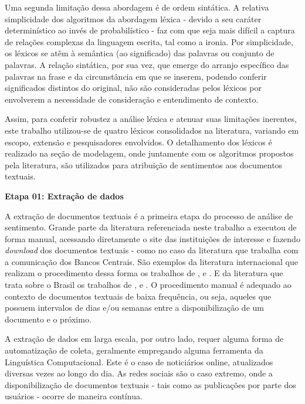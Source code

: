Uma segunda limitação dessa abordagem é de ordem sintática. A relativa simplicidade dos algoritmos da abordagem léxica - devido a seu caráter determinístico ao invés de probabilístico - faz com que seja mais difícil a captura de relações complexas da linguagem escrita, tal como a ironia. Por simplicidade, os léxicos se atêm à semântica (ao significado) das palavras ou conjunto de palavras. A relação sintática, por sua vez, que emerge do arranjo específico das palavras na frase e da circunstância em que se inserem, podendo conferir significados distintos do original, não são consideradas pelos léxicos por envolverem a necessidade de consideração e entendimento de contexto.

Assim, para conferir robustez a análise léxica e atenuar suas limitações inerentes, este trabalho utilizou-se de quatro léxicos consolidados na literatura, variando em escopo, extensão e pesquisadores envolvidos. O detalhamento dos léxicos é realizado na seção de modelagem, onde juntamente com os algoritmos propostos pela literatura, são utilizados para atribuição de sentimentos aos documentos textuais. 

\bigskip

\textbf{Etapa 01: Extração de dados}

A extração de documentos textuais é a primeira etapa do processo de análise de sentimento. Grande parte da literatura referenciada neste trabalho a executou de forma manual, acessando diretamente o site das instituições de interesse e fazendo \textit{download} dos documentos textuais - como no caso da literatura que trabalha com a comunicação dos Bancos Centrais. São exemplos da literatura internacional que realizam o procedimento dessa forma os trabalhos de \textcite{hansen_transparency_2018}, \textcite{gardner_words_2021} e \textcite{shapiro_taking_2021}. E da literatura que trata sobre o Brasil os trabalhos de \textcite{chague_central_2015}, \textcite{garcia-herrero_follow_2017} e \textcite{fasolo_seeing_2022}. O procedimento manual é adequado ao contexto de documentos textuais de baixa frequência, ou seja, aqueles que possuem intervalos de dias e/ou semanas entre a disponibilização de um documento e o próximo.

A extração de dados em larga escala, por outro lado, requer alguma forma de automatização de coleta, geralmente empregando alguma ferramenta da Linguística Computacional. Este é o caso de noticiários online, atualizados diversas vezes ao longo do dia. As redes sociais são o caso extremo, onde a disponibilização de documentos textuais - tais como as publicações por parte dos usuários - ocorre de maneira contínua. 

